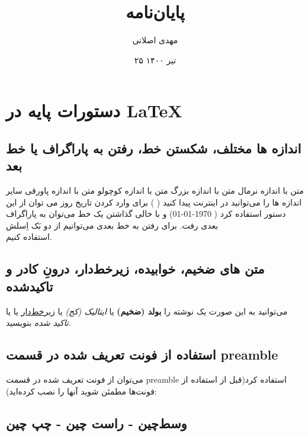 \documentclass[12pt]{book}
\title{پایان‌نامه}
\author{مهدی اصلانی}
\date{۲۵ تیر ۱۴۰۰}
\begin{document}
\maketitle

\chapter{دستورات پایه در \LaTeX}
\section{اندازه ها مختلف، شکستن خط، رفتن به پاراگراف یا خط بعد }


متن با اندازه نرمال
{\LARGE متن با اندازه بزرگ}
{\tiny  متن با اندازه کوچولو}
 {\footnotesize متن با اندازه پاورقی}
سایر اندازه ها را می‌توانید در اینترنت پیدا کنید (
)
  برای وارد کردن تاریخ روز می توان از این دستور استفاده کرد
( \today )
و با خالی گذاشتن یک خط می‌توان به پاراگراف بعدی رفت. برای رفتن به خط بعدی می‌توانیم از دو بَک اِسلش \\ استفاده کنیم.


\section{متن های ضخیم، خوابیده، زیرخط‌دار، درونِ کادر و تاکید‌شده}\label{boldItalicUnderline}
می‌توانید به این صورت  یک نوشته را 
\textbf{بولد (ضخیم)}
یا
\textit{ایتالیک (کج)}
یا
\underline{زیرخط‌دار}
یا
یا
\emph{تاکید شده}
بنویسید.


\section{استفاده از فونت تعریف شده در قسمت preamble}
می‌توان از فونت تعریف شده در قسمت preamble استفاده کرد(قبل از استفاده از فونت‌ها مطمئن شوید آنها را نصب کرده‌اید):\\

\newpage

\section{وسط‌چین - راست چین - چپ چین}
\end{document}
